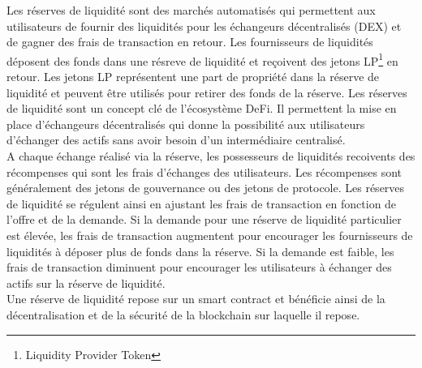 Les réserves de liquidité sont des marchés automatisés qui permettent aux utilisateurs de fournir des liquidités pour les échangeurs décentralisés (DEX) et de gagner des frais de transaction en retour. Les fournisseurs de liquidités déposent des fonds dans une résreve de liquidité et reçoivent des jetons LP\footnote{Liquidity Provider Token} en retour. Les jetons LP représentent une part de propriété dans la réserve de liquidité et peuvent être utilisés pour retirer des fonds de la réserve. Les réserves de liquidité sont un concept clé de l’écosystème DeFi. Il permettent la mise en place d'échangeurs décentralisés qui donne la possibilité aux utilisateurs d’échanger des \gls{actif}s sans avoir besoin d’un intermédiaire centralisé. \\
A chaque échange réalisé via la réserve, les possesseurs de liquidités recoivents des récompenses qui sont les frais d'échanges des utilisateurs. Les récompenses sont généralement des jetons de gouvernance ou des jetons de protocole. Les réserves de liquidité se régulent ainsi en ajustant les frais de transaction en fonction de l’offre et de la demande. Si la demande pour une réserve de liquidité particulier est élevée, les frais de transaction augmentent pour encourager les fournisseurs de liquidités à déposer plus de fonds dans la réserve. Si la demande est faible, les frais de transaction diminuent pour encourager les utilisateurs à échanger des \gls{actif}s sur la réserve de liquidité. \\
Une réserve de liquidité repose sur un \gls{smart contract} et bénéficie ainsi de la décentralisation et de la sécurité de la \gls{blockchain} sur laquelle il repose.
